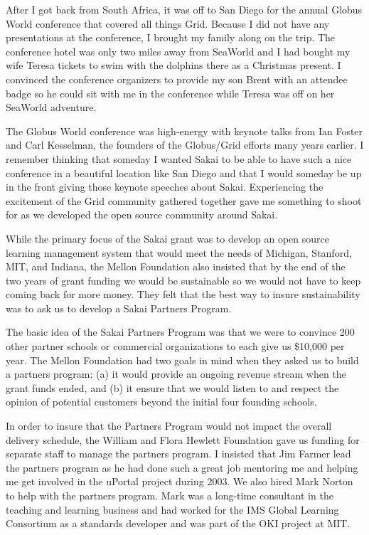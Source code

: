 \documentclass[12pt]{book}
\begin{document}
After I got back from South Africa, it was off to San Diego for the annual
Globus World conference that covered all things Grid.  Because I did not have any
presentations at the conference, I brought my family along on the trip.  The
conference hotel was only two miles away from SeaWorld and I had bought my wife
Teresa tickets to swim with the dolphins there as a Christmas present.
I convinced the conference organizers to provide my son Brent with an attendee badge
so he could sit with me in the conference while Teresa was off on her SeaWorld
adventure.

The Globus World conference was high-energy with keynote talks from Ian Foster
and Carl Kesselman, the founders of the Globus\slash Grid efforts many years
earlier.  I remember thinking that someday I wanted Sakai to be able to have
such a nice conference in a beautiful location like San Diego and that I would
someday be up in the front giving those keynote speeches about Sakai.  Experiencing
the excitement of the Grid community gathered together gave me something
to shoot for as we developed the open source community around Sakai.

While the primary focus of the Sakai grant was to develop an open source learning
management system that would meet the needs of Michigan, Stanford, MIT, and Indiana,
the Mellon Foundation also insisted that by the end of the two years of grant
funding we would be sustainable so we would not have to keep coming back for more
money.  They felt that the best way to insure sustainability was to ask us to
develop a Sakai Partners Program.

The basic idea of the Sakai Partners Program was that we were to convince 200 other
partner schools or commercial organizations to each give us \$10,000 per year.
The Mellon Foundation had two goals in mind
when they asked us to build a partners program: (a) it would provide an ongoing revenue
stream when the grant funds ended, and (b) it ensure that we would listen to
and respect the opinion of potential customers beyond the initial four
founding schools.

In order to insure that the Partners Program would not impact the overall delivery
schedule, the William and Flora Hewlett Foundation gave us funding for separate
staff to manage the partners program.  I insisted that Jim Farmer lead the partners
program as he had done such a great job mentoring me and helping me get involved
in the uPortal project during 2003.  We also hired Mark Norton to help with the
partners program.  Mark was a long-time consultant in the teaching and learning business
and had worked for the IMS Global Learning Consortium as a standards developer and
was part of the OKI project at MIT.
\end{document}
